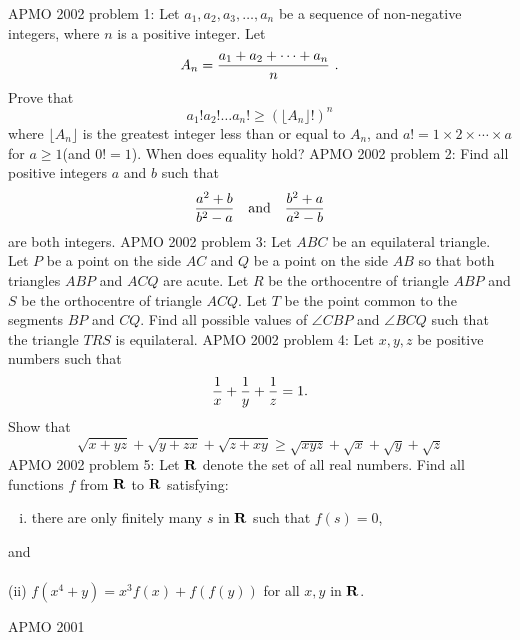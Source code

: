 APMO 2002 problem 1:  Let $a_1,a_2,a_3,\ldots,a_n$ be a sequence of non-negative integers, where $n$ is a positive integer. Let
\[ A_n={a_1+a_2+\cdots+a_n\over n}\ . \]
Prove that
\[ a_1!a_2!\ldots a_n!\ge\left(\lfloor A_n\rfloor !\right)^n \]
where $\lfloor A_n\rfloor$ is the greatest integer less than or equal to $A_n$, and $a!=1\times 2\times\cdots\times a$ for $a\ge 1$(and $0!=1$). When does equality hold? 
APMO 2002 problem 2:  Find all positive integers $a$ and $b$ such that
\[ {a^2+b\over b^2-a}\quad\mbox{and}\quad{b^2+a\over a^2-b} \]
are both integers. 
APMO 2002 problem 3:  Let $ABC$ be an equilateral triangle. Let $P$ be a point on the side $AC$ and $Q$ be a point on the side $AB$ so that both triangles $ABP$ and $ACQ$ are acute. Let $R$ be the orthocentre of triangle $ABP$ and $S$ be the orthocentre of triangle $ACQ$. Let $T$ be the point common to the segments $BP$ and $CQ$. Find all possible values of $\angle CBP$ and $\angle BCQ$ such that the triangle $TRS$ is equilateral. 
APMO 2002 problem 4:  Let $x,y,z$ be positive numbers such that
\[ {1\over x}+{1\over y}+{1\over z}=1. \]
Show that
\[ \sqrt{x+yz}+\sqrt{y+zx}+\sqrt{z+xy}\ge\sqrt{xyz}+\sqrt{x}+\sqrt{y}+\sqrt{z} \] 
APMO 2002 problem 5:  Let ${\bf R}$ denote the set of all real numbers. Find all functions $f$ from ${\bf R}$ to ${\bf R}$ satisfying:
\begin{enumerate}[(i)]
  \item there are  only finitely many $s$ in ${\bf R}$ such that $f(s)=0$,
\end{enumerate}
and \\\\
(ii) $f(x^4+y)=x^3f(x)+f(f(y))$ for all $x,y$ in ${\bf R}$. 

APMO 2001 

